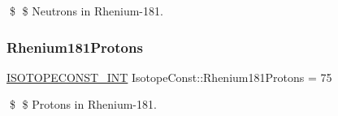 \$ \$ Neutrons in Rhenium-\/181. \mbox{\label{group___isotope_const-_rhenium-_re181_ga8ade8fe04381de8e39fa7f8c20617ea0}} 
\subsubsection{\texorpdfstring{Rhenium181\+Protons}{Rhenium181Protons}}
{\footnotesize\ttfamily \mbox{\hyperlink{group___isotope_const-_macros_ga5f18360b3e99483a35c32d789e62621c}{I\+S\+O\+T\+O\+P\+E\+C\+O\+N\+S\+T\+\_\+\+I\+NT}} Isotope\+Const\+::\+Rhenium181\+Protons = 75}

\$ \$ Protons in Rhenium-\/181. 